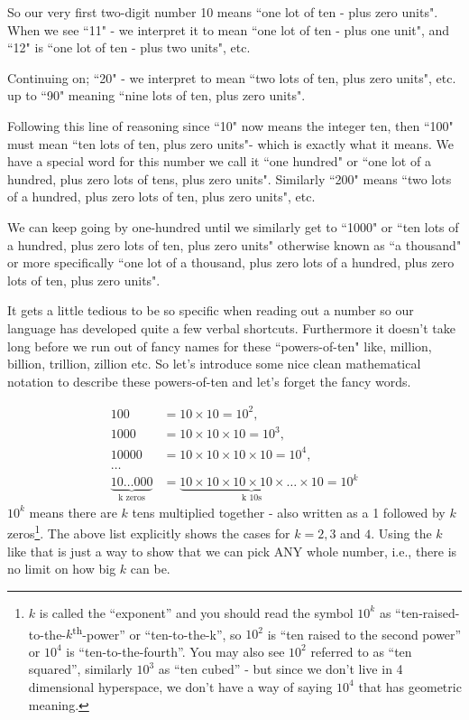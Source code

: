 \documentclass{article}
\begin{document}
So our very first two-digit number 10 means ``one lot of ten - plus zero units".
When we see ``11" - we interpret it to mean ``one lot of ten - plus one unit",
and ``12" is ``one lot of ten - plus two units", etc.

Continuing on; ``20" - we interpret to mean ``two lots of ten,
plus zero units", etc. up to ``90" meaning ``nine lots of ten,
plus zero units".

Following this line of reasoning since ``10" now means the integer ten,
then ``100" must mean ``ten lots of ten,
plus zero units"- which is exactly what it means.
We have a special word for this number we call it ``one hundred" or ``one lot of a hundred,
plus zero lots of tens, plus zero units".
Similarly ``200" means ``two lots of a hundred, plus zero lots of ten,
plus zero units", etc.

We can keep going by one-hundred until we similarly get to ``1000" or ``ten lots of a hundred,
plus zero lots of ten, plus zero units" otherwise known
as ``a thousand" or more specifically ``one lot of a thousand,
plus zero lots of a hundred, plus zero lots of ten, plus zero units".

It gets a little tedious to be so specific when reading out
a number so our language has developed quite a few verbal shortcuts.
Furthermore it doesn't take long before we run out of fancy names
for these ``powers-of-ten" like, million, billion, trillion,
zillion etc. So let's introduce some nice clean mathematical notation
to describe these powers-of-ten and let's forget the fancy words.

\begin{align*}
100&=10\times10=10^2,\\
1000&= 10\times10\times10=10^3,\\
10000&= 10\times10\times10\times10=10^4,\\
\dots{}\\
\underbrace{10\dots{}000}_\text{k zeros}&= \underbrace{10\times10\times10\times10\times\dots{}\times10}_\text{k 10s}=10^k
\end{align*}
$10^k$ means there are $k$ tens multiplied together - 
also written as a 1 followed by $k$ zeros\footnote{$k$ is called the ``exponent'' and you should
read the symbol $10^k$ as ``ten-raised-to-the-$k$\textsuperscript{th}-power'' or ``ten-to-the-k'',
so $10^2$ is ``ten raised to the second power'' or $10^4$ is ``ten-to-the-fourth''.
You may also see $10^2$ referred to as ``ten squared'',
similarly $10^3$ as ``ten cubed'' - but since we 
don't live in 4 dimensional hyperspace,
we don't have a way of saying $10^4$ that has geometric meaning.}.
The above list explicitly shows the cases for $k = 2, 3$ and $4$.
Using the $k$ like that is just a way to show that we can pick ANY whole number,
i.e., there is no limit on how big $k$ can be.
\end{document}
